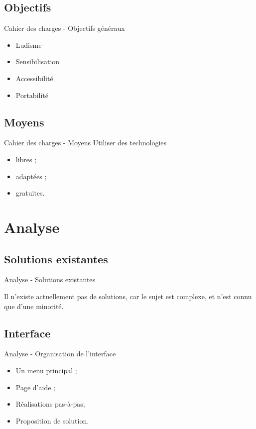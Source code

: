 \documentclass{beamer}
\begin{document}
	\subsection{Objectifs}
		\begin{frame}{Cahier des charges - Objectifs généraux}
			\begin{itemize}\setlength{\itemsep}{0.75cm}
                \item Ludisme
                \item Sensibilisation
                \item Accessibilité
                \item Portabilité
			\end{itemize}
		\end{frame}
	\subsection{Moyens}
		\begin{frame}{Cahier des charges - Moyens}
		    Utiliser des technologies
			\begin{itemize}
				\item libres ;
				\item adaptées ;
				\item gratuites.
			\end{itemize}
		\end{frame}
\section{Analyse}
	\subsection{Solutions existantes}
		\begin{frame}{Analyse - Solutions existantes }
		\begin{center}
		Il n'existe actuellement pas de solutions,
		car le sujet est complexe, et n'est connu que d'une minorité.
		\end{center}
		\end{frame}
	\subsection{Interface}
		\begin{frame}{Analyse - Organisation de l'interface}
			\begin{itemize}
				\setlength{\itemsep}{0.5cm}
				\item Un menu principal ;
				\item Page d'aide ;
				\item Réalisations pas-à-pas;
				\item Proposition de solution.
			\end{itemize}
		\end{frame}
\end{document}
